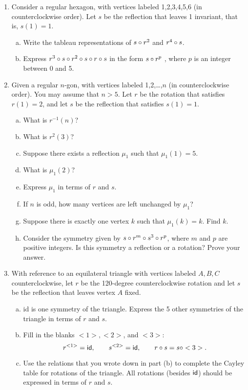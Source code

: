 \begin{enumerate}

\item
Consider a regular hexagon, with vertices labeled 1,2,3,4,5,6 (in counterclockwise order). Let $s$ be the reflection that  leaves 1 invariant, that is, $s(1) = 1$.
\begin{enumerate}[(a)]
\item
Write the tableau representations of $s \circ r^2$ and $ r^4 \circ s$.
\item
Express $r^3 \circ  s \circ  r^2 \circ  s \circ  r\circ s$ in the form $s \circ r^p$ , where $p$ is an integer between 0 and 5.
\end{enumerate}

\item
Given a regular $n$-gon, with vertices labeled 1,2,…,$n$ (in counterclockwise order).  You may assume that $n>5$. Let $r$ be the rotation that satisfies $r(1)=2$, and let $s$ be the reflection that satisfies $s(1)=1$.
\begin{enumerate}[(a)]
\item
What is $r^{-1}(n)$?
\item
What is $r^2(3)$?  
\item
Suppose there exists a reflection $\mu_1$ such that $\mu_1(1)=5$. 
\item
What is  $\mu_1(2)$?
\item  
Express $\mu_1$ in terms of $r$ and $s$.
\item
If $n$ is odd, how many vertices are left unchanged by $\mu_1$?
\item 
Suppose there is exactly one vertex $k$ such that  $\mu_1(k)=k$.  Find $k$.
\item 
Consider the symmetry given by $s \circ r^m \circ s^3 \circ r^p$, where $m$ and $p$ are positive integers. Is this symmetry a reflection or a rotation?  Prove your answer. 
\end{enumerate}

\item
With reference to an equilateral triangle with vertices labeled $A,B,C$ counterclockwise, let $r$ be the 120-degree counterclockwise rotation and let $s$ be the reflection that leaves vertex $A$ fixed. 
\begin{enumerate}[(a)]
\item
{\var id} is one symmetry of the triangle. Express the 5 other symmetries of the triangle in terms of $r$ and $s$.  
\item
Fill in the blanks $<1>,  <2>$, and $<3>$: 
\[r^{<1>} = {\sf{i}d}, \qquad s^{<2>} = {\sf{i}d},\qquad  r \circ s = s \circ <3>. \]
\item
Use the relations that you wrote down in part (b) to complete the Cayley table for rotations of the triangle.  All rotations (besides ${\sf{i}d}$) should be expressed in terms of $r$ and $s$.
\end{enumerate}


\end{enumerate}




